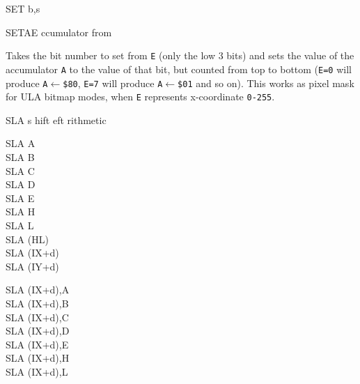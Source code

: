 \begin{basedescript}{
	\desclabelstyle{\multilinelabel}
	\desclabelwidth{3cm}}
\begin{DetailItem}{SET b,s}
\begin{multicols}{2}
		\end{multicols}

		\begin{DetailEffects}
			\FlagsSETr
		\end{DetailEffects}			

		\begin{DetailTiming}
			\DetailTime[r]{2}{8}
			\DetailTime[(HL)]{4}{15}
			\DetailTime[(IX+d)]{6}{23}
			\DetailTime[(IY+d)]{6}{23}
		\end{DetailTiming}

	\end{DetailItem}

	\begin{DetailItem}{SETAE\ZXN}
		{ ccumulator from \IH{E}}
		{\SymSETAE}

		Takes the bit number to set from {\tt E} (only the low 3 bits) and sets the value of the accumulator {\tt A} to the value of that bit, but counted from top to bottom ({\tt E=0} will produce {\tt A$\leftarrow$\$80}, {\tt E=7} will produce {\tt A$\leftarrow$\$01} and so on). This works as pixel mask for ULA bitmap modes, when {\tt E} represents x-coordinate {\tt 0-255}.

		\begin{DetailEffects}
			\FlagsSETAE
		\end{DetailEffects}
						
		\begin{DetailTiming}
			\DetailTime{2}{8}
		\end{DetailTiming}

	\end{DetailItem}

	\pagebreak
	\begin{DetailItem}{SLA s}
		{hift eft rithmetic}
		{\SymSLA{s}}
		
		\begin{DetailVariants}
			SLA A\\
			SLA B\\
			SLA C\\
			SLA D\\
			SLA E\\
			SLA H\\
			SLA L\\
			SLA (HL)\\
			SLA (IX+d)\\
			SLA (IY+d)

			\columnbreak
			SLA (IX+d),A\UNDOC\\
			SLA (IX+d),B\UNDOC\\
			SLA (IX+d),C\UNDOC\\
			SLA (IX+d),D\UNDOC\\
			SLA (IX+d),E\UNDOC\\
			SLA (IX+d),H\UNDOC\\
			SLA (IX+d),L\UNDOC


\end{DetailVariants}
\end{DetailItem}
\end{basedescript}
